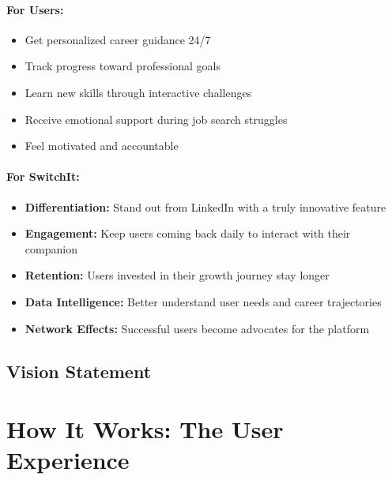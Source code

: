 \documentclass[12pt,a4paper]{article}
\begin{document}
\paragraph{For Users:}
\begin{itemize}
    \item Get personalized career guidance 24/7
    \item Track progress toward professional goals
    \item Learn new skills through interactive challenges
    \item Receive emotional support during job search struggles
    \item Feel motivated and accountable
\end{itemize}

\paragraph{For SwitchIt:}
\begin{itemize}
    \item \textbf{Differentiation:} Stand out from LinkedIn with a truly innovative feature
    \item \textbf{Engagement:} Keep users coming back daily to interact with their companion
    \item \textbf{Retention:} Users invested in their growth journey stay longer
    \item \textbf{Data Intelligence:} Better understand user needs and career trajectories
    \item \textbf{Network Effects:} Successful users become advocates for the platform
\end{itemize}

\subsection{Vision Statement}

\begin{center}
\end{center}

\section{How It Works: The User Experience}
\end{document}
